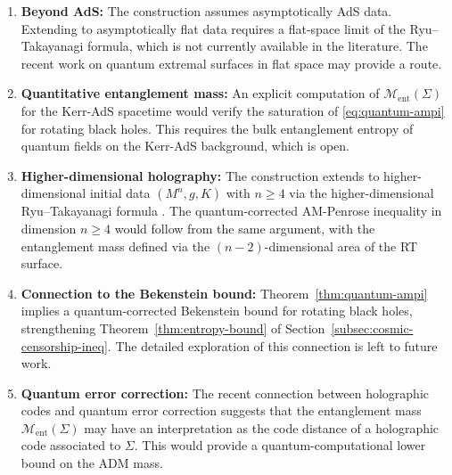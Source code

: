 \begin{remark}
\begin{enumerate}
\item \textbf{Beyond AdS:} The construction assumes asymptotically AdS data. Extending to asymptotically flat data requires a flat-space limit of the Ryu--Takayanagi formula, which is not currently available in the literature. The recent work \cite{faulkner2013, engelhardtwall2015} on quantum extremal surfaces in flat space may provide a route.
\item \textbf{Quantitative entanglement mass:} An explicit computation of $\mathcal{M}_{\mathrm{ent}}(\Sigma)$ for the Kerr-AdS spacetime would verify the saturation of \eqref{eq:quantum-ampi} for rotating black holes. This requires the bulk entanglement entropy of quantum fields on the Kerr-AdS background, which is open.
\item \textbf{Higher-dimensional holography:} The construction extends to higher-dimensional initial data $(M^n, g, K)$ with $n \geq 4$ via the higher-dimensional Ryu--Takayanagi formula \cite{ryutakayanagi2006}. The quantum-corrected AM-Penrose inequality in dimension $n \geq 4$ would follow from the same argument, with the entanglement mass defined via the $(n-2)$-dimensional area of the RT surface.
\item \textbf{Connection to the Bekenstein bound:} Theorem~\ref{thm:quantum-ampi} implies a quantum-corrected Bekenstein bound for rotating black holes, strengthening Theorem~\ref{thm:entropy-bound} of Section~\ref{subsec:cosmic-censorship-ineq}. The detailed exploration of this connection is left to future work.
\item \textbf{Quantum error correction:} The recent connection between holographic codes and quantum error correction \cite{almheiri2015, harlowhayden2013} suggests that the entanglement mass $\mathcal{M}_{\mathrm{ent}}(\Sigma)$ may have an interpretation as the code distance of a holographic code associated to $\Sigma$. This would provide a quantum-computational lower bound on the ADM mass.
\end{enumerate}
\end{remark}

